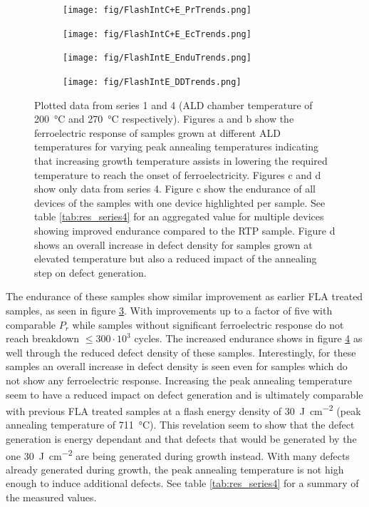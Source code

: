 \documentclass[11pt,twoside,final]{eitExjobb}  %
\begin{document}
\begin{figure}[htbp]
    \centering
    \begin{subfigure}{.4\linewidth}
        \texttt{[image: fig/FlashIntC+E\_PrTrends.png]}
        \caption{}\label{fig:res_IntEPr}
    \end{subfigure}
    \begin{subfigure}{.4\linewidth}
        \texttt{[image: fig/FlashIntC+E\_EcTrends.png]}
        \caption{}\label{fig:res_IntEEc}
    \end{subfigure}
    \begin{subfigure}{.4\linewidth}
        \texttt{[image: fig/FlashIntE\_EnduTrends.png]}
        \caption{}\label{fig:res_IntEEndu}
    \end{subfigure}
    \begin{subfigure}{.4\linewidth}
        \texttt{[image: fig/FlashIntE\_DDTrends.png]}
        \caption{}\label{fig:res_IntEDD}    
    \end{subfigure}
    \caption{Plotted data from series 1 and 4 (ALD chamber temperature of
        \SI{200}{\celsius} and \SI{270}{\celsius} respectively). Figures a and
        b show the ferroelectric response of samples grown at different ALD
        temperatures for varying peak annealing temperatures indicating that
        increasing growth temperature assists in lowering the required
        temperature to reach the onset of ferroelectricity. Figures c and d
        show only data from series 4. Figure c show the endurance of all
        devices of the samples with one device highlighted per sample. See
        table \ref{tab:res_series4} for an aggregated value for multiple
        devices showing improved endurance compared to the RTP sample. Figure d
        shows an overall increase in defect density for samples grown at
        elevated temperature but also a reduced impact of the annealing step on
        defect generation.}\label{fig:res_IntE}
\end{figure}

The endurance of these samples show similar improvement as earlier FLA treated
samples, as seen in figure \ref{fig:res_IntEEndu}. With improvements up to a
factor of five with comparable $P_r$ while samples without significant
ferroelectric response do not reach breakdown $\leq 300\cdot10^3$ cycles. The
increased endurance shows in figure \ref{fig:res_IntEDD} as well through the
reduced defect density of these samples. Interestingly, for these samples an
overall increase in defect density is seen even for samples which do not show
any ferroelectric response. Increasing the peak annealing temperature seem to
have a reduced impact on defect generation and is ultimately comparable with
previous FLA treated samples at a flash energy density of
\SI{30}{\joule\per\centi\meter\squared} (peak annealing temperature of
\SI{711}{\celsius}). This revelation seem to show that the defect generation is
energy dependant and that defects that would be generated by the one
\SI{30}{\joule\per\centi\meter\squared} are being generated during growth
instead. With many defects already generated during growth, the peak annealing
temperature is not high enough to induce additional defects. See table
\ref{tab:res_series4} for a summary of the measured values.
\end{document}
